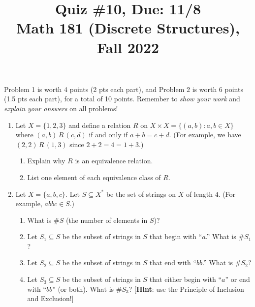 \documentclass[11pt]{article}
\title{Quiz \#10, Due: 11/8 \\Math 181 (Discrete Structures), Fall 2022}
\date{}
\begin{document}
\maketitle

\thispagestyle{empty}

\vspace{-1cm}

Problem 1 is worth 4 points (2 pts each part), and Problem 2 is worth 6 points (1.5 pts each part), for a total of 10 points. Remember to \emph{show your work} and \emph{explain your answers} on all problems!

\begin{enumerate}

\item Let $X= \{1,2,3\}$ and define a relation $R$ on $X \times X = \{(a,b)\colon a, b\in X\}$ where $(a,b) \, R \, (c,d)$ if and only if $a+b = c+d$. (For example, we have $(2,2) \, R \, (1,3)$ since $2+2=4=1+3$.)
\begin{enumerate}
\item Explain why $R$ is an equivalence relation.
\item List one element of each equivalence class of $R$.
\end{enumerate}

\item Let $X = \{a,b,c\}$. Let $S\subseteq X^{*}$ be the set of strings on $X$ of length $4$. (For example, $abbc \in S$.)
\begin{enumerate}
\item What is $\#S $ (the number of elements in $S$)?
\item Let $S_1 \subseteq S$ be the subset of strings in $S$ that begin with ``$a$.'' What is $\#S_1$?
\item Let $S_2 \subseteq S$ be the subset of strings in $S$ that end with ``$bb$.'' What is $\#S_2$?
\item Let $S_3 \subseteq S$ be the subset of strings in $S$ that either begin with ``$a$'' or end with ``$bb$'' (or both). What is $\#S_3$? [{\bf Hint}: use the Principle of Inclusion and Exclusion!]
\end{enumerate}

\end{enumerate}
\end{document}
